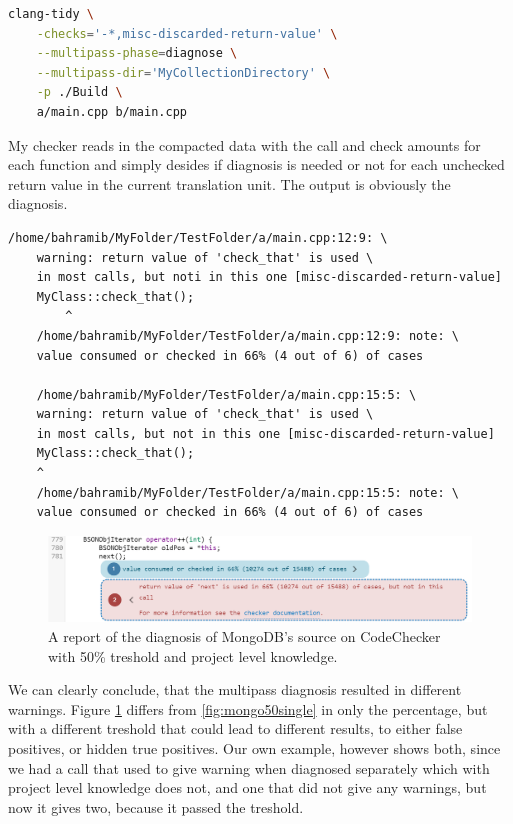 \begin{lstlisting}[language={bash}]
	clang-tidy \
	-checks='-*,misc-discarded-return-value' \
	--multipass-phase=diagnose \
	--multipass-dir='MyCollectionDirectory' \
	-p ./Build \
	a/main.cpp b/main.cpp
\end{lstlisting}

My checker reads in the compacted data with the call and check amounts for each function and simply desides
if diagnosis is needed or not for each unchecked return value in the current translation unit.
The output is obviously the diagnosis.

\begin{lstlisting}[caption={Diagnosis output with project level knowledge.},captionpos=b]
	/home/bahramib/MyFolder/TestFolder/a/main.cpp:12:9: \
	warning: return value of 'check_that' is used \
	in most calls, but noti in this one [misc-discarded-return-value]
	MyClass::check_that();
		^
	/home/bahramib/MyFolder/TestFolder/a/main.cpp:12:9: note: \
	value consumed or checked in 66% (4 out of 6) of cases

	/home/bahramib/MyFolder/TestFolder/a/main.cpp:15:5: \
	warning: return value of 'check_that' is used \
	in most calls, but not in this one [misc-discarded-return-value]
	MyClass::check_that();
	^
	/home/bahramib/MyFolder/TestFolder/a/main.cpp:15:5: note: \
	value consumed or checked in 66% (4 out of 6) of cases
\end{lstlisting}



\begin{figure}[H]
	\includegraphics[width=\linewidth]{images/codechecker_first_ss_mongo_multi_50.png}
	\caption{A report of the diagnosis of MongoDB's source on CodeChecker with 50\% treshold and project level knowledge.}
	\label{fig:mongo50multi}
\end{figure}

We can clearly conclude, that the multipass diagnosis resulted in different warnings. Figure \cref{fig:mongo50multi}
differs from \cref{fig:mongo50single} in only the percentage, but with a different treshold that could lead to different
results, to either false positives, or hidden true positives. Our own example, however shows both, since we had a call
that used to give warning when diagnosed separately which with project level knowledge does not, and one that did not give
any warnings, but now it gives two, because it passed the treshold.

